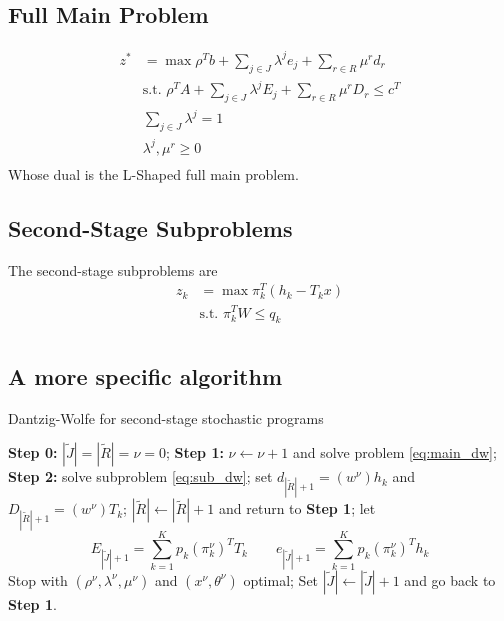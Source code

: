 \documentclass[12pt, openany]{report}
\theoremstyle{definition}
\begin{document}
\subsection{Full Main Problem}
\begin{equation}\label{eq:main_dw}
	\begin{aligned}
		z^* &= \max \rho^Tb + \sum_{j\in J}\lambda^j e_j + \sum_{r\in R}\mu^r d_r\\
		& \text{s.t. }\rho^T A + \sum_{j\in J} \lambda^j E_j + \sum_{r\in R}\mu^r D_r \le c^T\\
		& \sum_{j\in J}\lambda^j = 1\\
		& \lambda^j, \mu^r \ge 0\\
	\end{aligned}
\end{equation}
Whose dual is the L-Shaped full main problem. 
\subsection{Second-Stage Subproblems}
The second-stage subproblems are
\begin{equation}\label{eq:sub_dw}
	\begin{aligned}
		z_k &= \max \pi_k^T(h_k-T_kx)\\
		& \text{s.t. } \pi_k^T W\le q_k\\
	\end{aligned}
\end{equation}
\subsection{A more specific algorithm}
\begin{algorithm}[H]
	\caption{Dantzig-Wolfe for second-stage stochastic programs}
	\label{algo:dw_sssp}
	\begin{algorithmic}[1]
		\State \textbf{Step 0:} $|\tilde J|=|\tilde R|=\nu=0$;
		\State \textbf{Step 1:} $\nu \gets \nu + 1$ and solve problem \eqref{eq:main_dw};
		\State \textbf{Step 2:}  solve subproblem \eqref{eq:sub_dw};
		 set $d_{|\tilde R|+1} = (w^\nu)h_k$ and $D_{|\tilde R|+1} = (w^\nu)T_k$; 
				$|\tilde R| \gets |\tilde R| + 1$ and return to \textbf{Step 1};
		\EndIf 
		\EndFor
		 let 
		\begin{equation}
			E_{|\tilde J|+1} = \sum_{k=1}^K p_k(\pi_k^\nu)^T T_k \qquad e_{|\tilde J|+1} = \sum_{k=1}^K p_k (\pi_k^\nu)^T h_k 
		\end{equation}
		\State Stop with $(\rho^\nu, \lambda^\nu, \mu^\nu)$ and $(x^\nu, \theta^\nu)$ optimal;
		\Else 
		\State Set $|\tilde J| \gets |\tilde J| + 1$ and go back to \textbf{Step 1}.
		\EndIf 
		\EndIf 
	\end{algorithmic}
\end{algorithm}
\end{document}
